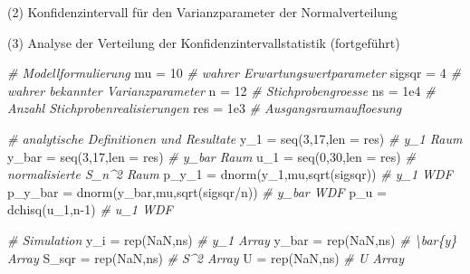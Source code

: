 \documentclass[
  8pt,
  ignorenonframetext,
]{beamer}
\newenvironment{Shaded}{\begin{snugshade}}{\end{snugshade}}
\newcommand{\AttributeTok}[1]{\textcolor[rgb]{0.77,0.63,0.00}{#1}}
\newcommand{\CommentTok}[1]{\textcolor[rgb]{0.56,0.35,0.01}{\textit{#1}}}
\newcommand{\ConstantTok}[1]{\textcolor[rgb]{0.00,0.00,0.00}{#1}}
\newcommand{\DecValTok}[1]{\textcolor[rgb]{0.00,0.00,0.81}{#1}}
\newcommand{\FloatTok}[1]{\textcolor[rgb]{0.00,0.00,0.81}{#1}}
\newcommand{\FunctionTok}[1]{\textcolor[rgb]{0.00,0.00,0.00}{#1}}
\newcommand{\NormalTok}[1]{#1}
\newcommand{\OtherTok}[1]{\textcolor[rgb]{0.56,0.35,0.01}{#1}}
\newcommand{\SpecialCharTok}[1]{\textcolor[rgb]{0.00,0.00,0.00}{#1}}
\begin{document}
\begin{frame}[fragile]{(2) Konfidenzintervall für den Varianzparameter
der Normalverteilung}
\protect\hypertarget{konfidenzintervall-fuxfcr-den-varianzparameter-der-normalverteilung-1}{}
\normalsize

\noindent (3) Analyse der Verteilung der Konfidenzintervallstatistik
(fortgeführt) \vspace{2mm}

\tiny
{}

\begin{Shaded}
\begin{Highlighting}[]
\CommentTok{\# Modellformulierung}
\NormalTok{mu      }\OtherTok{=} \DecValTok{10}                                    \CommentTok{\# wahrer Erwartungswertparameter}
\NormalTok{sigsqr  }\OtherTok{=} \DecValTok{4}                                     \CommentTok{\# wahrer bekannter Varianzparameter}
\NormalTok{n       }\OtherTok{=} \DecValTok{12}                                    \CommentTok{\# Stichprobengroesse}
\NormalTok{ns      }\OtherTok{=} \FloatTok{1e4}                                   \CommentTok{\# Anzahl Stichprobenrealisierungen}
\NormalTok{res     }\OtherTok{=} \FloatTok{1e3}                                   \CommentTok{\# Ausgangsraumaufloesung}

\CommentTok{\# analytische Definitionen und Resultate}
\NormalTok{y\_1     }\OtherTok{=} \FunctionTok{seq}\NormalTok{(}\DecValTok{3}\NormalTok{,}\DecValTok{17}\NormalTok{,}\AttributeTok{len =}\NormalTok{ res)                   }\CommentTok{\# y\_1 Raum}
\NormalTok{y\_bar   }\OtherTok{=} \FunctionTok{seq}\NormalTok{(}\DecValTok{3}\NormalTok{,}\DecValTok{17}\NormalTok{,}\AttributeTok{len =}\NormalTok{ res)                   }\CommentTok{\# y\_bar Raum}
\NormalTok{u\_1     }\OtherTok{=} \FunctionTok{seq}\NormalTok{(}\DecValTok{0}\NormalTok{,}\DecValTok{30}\NormalTok{,}\AttributeTok{len =}\NormalTok{ res)                   }\CommentTok{\# normalisierte S\_n\^{}2 Raum}
\NormalTok{p\_y\_1   }\OtherTok{=} \FunctionTok{dnorm}\NormalTok{(y\_1,mu,}\FunctionTok{sqrt}\NormalTok{(sigsqr))            }\CommentTok{\# y\_1 WDF}
\NormalTok{p\_y\_bar }\OtherTok{=} \FunctionTok{dnorm}\NormalTok{(y\_bar,mu,}\FunctionTok{sqrt}\NormalTok{(sigsqr}\SpecialCharTok{/}\NormalTok{n))        }\CommentTok{\# y\_bar WDF}
\NormalTok{p\_u     }\OtherTok{=} \FunctionTok{dchisq}\NormalTok{(u\_1,n}\DecValTok{{-}1}\NormalTok{)                       }\CommentTok{\# u\_1 WDF}

\CommentTok{\# Simulation}
\NormalTok{y\_i     }\OtherTok{=} \FunctionTok{rep}\NormalTok{(}\ConstantTok{NaN}\NormalTok{,ns)                           }\CommentTok{\# y\_1 Array}
\NormalTok{y\_bar   }\OtherTok{=} \FunctionTok{rep}\NormalTok{(}\ConstantTok{NaN}\NormalTok{,ns)                           }\CommentTok{\# \textbackslash{}bar\{y\} Array}
\NormalTok{S\_sqr   }\OtherTok{=} \FunctionTok{rep}\NormalTok{(}\ConstantTok{NaN}\NormalTok{,ns)                           }\CommentTok{\# S\^{}2 Array}
\NormalTok{U       }\OtherTok{=} \FunctionTok{rep}\NormalTok{(}\ConstantTok{NaN}\NormalTok{,ns)                           }\CommentTok{\# U Array}


\end{Highlighting}
\end{Shaded}
\end{frame}
\end{document}
